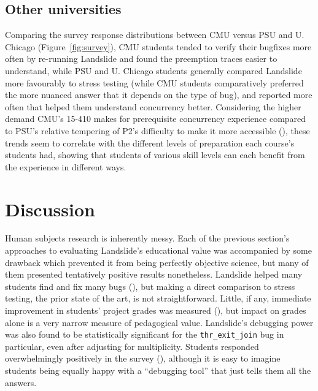 \subsection{Other universities}

Comparing the survey response distributions between CMU versus PSU and U. Chicago (Figure~\ref{fig:survey}),
CMU students tended to verify their bugfixes more often by re-running Landslide
and found the preemption traces easier to understand,
while PSU and U. Chicago students generally compared Landslide more favourably to stress testing
(while CMU students comparatively preferred the more nuanced answer that it depends on the type of bug),
and reported more often that helped them understand concurrency better.
Considering the higher demand CMU's 15-410 makes for prerequisite concurrency experience
compared to PSU's relative tempering of P2's difficulty to make it more accessible (\sect{\ref{sec:pebbles}}),
these trends seem to correlate with the different levels of preparation each course's students had,
showing that students of various skill levels
can each benefit from the experience in different ways.




\section{Discussion}

Human subjects research is inherently messy.
Each of the previous section's approaches to evaluating Landslide's educational value
was accompanied by some drawback which prevented it from being perfectly objective science,
but many of them presented tentatively positive results nonetheless.
Landslide helped many students find and fix many bugs (\sect{\ref{sec:education-eval-bugfinding}}),
but making a direct comparison to stress testing, the prior state of the art, is not straightforward.
Little, if any,
immediate improvement in students' project grades was measured
(\sect{\ref{sec:education-eval-grades}}),
but impact on grades alone is a very narrow measure of pedagogical value.
Landslide's debugging power was also found to be statistically significant
for the {\tt thr\_exit\_join} bug in particular, even after adjusting for multiplicity.
Students responded overwhelmingly positively in the survey (\sect{\ref{sec:education-eval-survey}}),
although it is easy to imagine students being equally happy with a ``debugging tool'' that just tells them all the answers.

